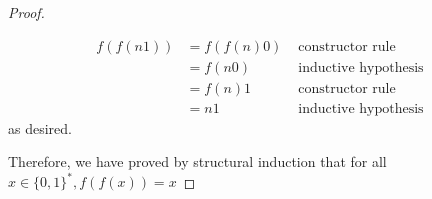 \documentclass[11pt]{scrartcl}
\begin{document}
\begin{proof}
\begin{enumerate}[label=\roman*.]
{\begin{enumerate}[label=\alph*.]
{\begin{align*}
				            f(f(n1)) & = f(f(n)0) & \text { constructor rule}     \\
				                     & = f(n0)    & \text { inductive hypothesis} \\
				                     & = f(n)1    & \text { constructor rule}     \\
				                     & = n1       & \text { inductive hypothesis}
			            \end{align*}
			            as desired.
			            }
		      \end{enumerate}
		      }
	\end{enumerate}
	Therefore, we have proved by structural induction that for all $x \in\{0,1\}^{*}, f(f(x))=x$
\end{proof}
\end{document}
